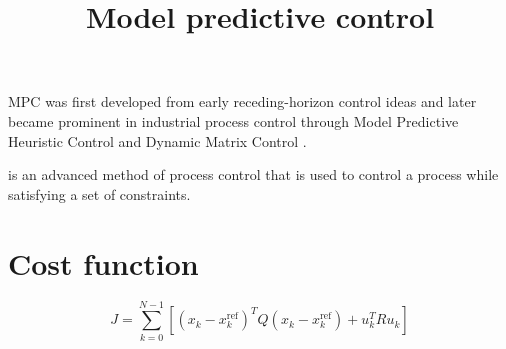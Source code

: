 \documentclass[a4paper]{article}
\title{Model predictive control}
\date{}
\begin{document}
    \maketitle
    MPC was first developed from early receding-horizon control ideas
    \citep{propoi-1963-use-of-linear-programming-methods-for-synthesizing-sampled-data-automatic-systems} and later became prominent in industrial process control through Model Predictive
    Heuristic Control and Dynamic Matrix Control
    \citep{richalet-1978-model-predictive-heuristic-control-applications-to-industrial-processes,
        cutler-1980-dynamic-matrix-control-a-computer-control-algorithm}.
    
    is an advanced method of process control that is used to control a process while satisfying a set of constraints. 
    
    
    \section{Cost function}
        
        \[
            J =
            \sum_{k=0}^{N-1}
            \left[
                \left( x_k - x_k^{\mathrm{ref}} \right)^{T}
                Q
                \left( x_k - x_k^{\mathrm{ref}} \right)
                +
                u_k^{T} R u_k
            \right]
        \]
        
\end{document}
